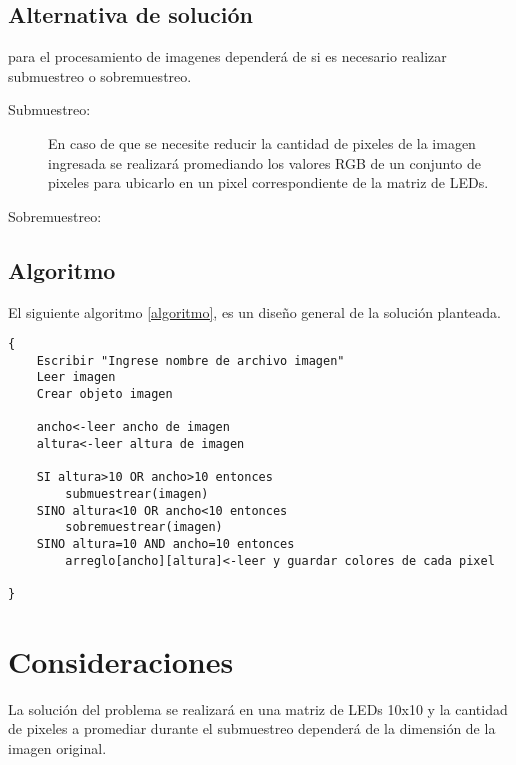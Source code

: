 \documentclass{article}
\begin{document}
\subsection{Alternativa de solución}

para el procesamiento de imagenes dependerá de si es necesario realizar submuestreo o sobremuestreo.

\begin{description}
   \item[Submuestreo:] En caso de que se necesite reducir la cantidad de pixeles de la imagen ingresada se realizará promediando los valores RGB de un conjunto de pixeles para ubicarlo en un pixel correspondiente de la matriz de LEDs.
   \item[Sobremuestreo:] 
\end{description}


\subsection{Algoritmo}
%
El siguiente algoritmo \ref{algoritmo}, es un diseño general de la solución planteada. 


\begin{lstlisting}[label=algoritmo]
{
    Escribir "Ingrese nombre de archivo imagen"
    Leer imagen
    Crear objeto imagen
    
    ancho<-leer ancho de imagen
    altura<-leer altura de imagen
    
    SI altura>10 OR ancho>10 entonces
        submuestrear(imagen)
    SINO altura<10 OR ancho<10 entonces
        sobremuestrear(imagen)
    SINO altura=10 AND ancho=10 entonces
        arreglo[ancho][altura]<-leer y guardar colores de cada pixel 

}

\end{lstlisting}

\section{Consideraciones} \label{Consideraciones}
La solución del problema se realizará en una matriz de LEDs 10x10 y la cantidad de pixeles a promediar durante el submuestreo dependerá de la dimensión de la imagen original.
\end{document}
